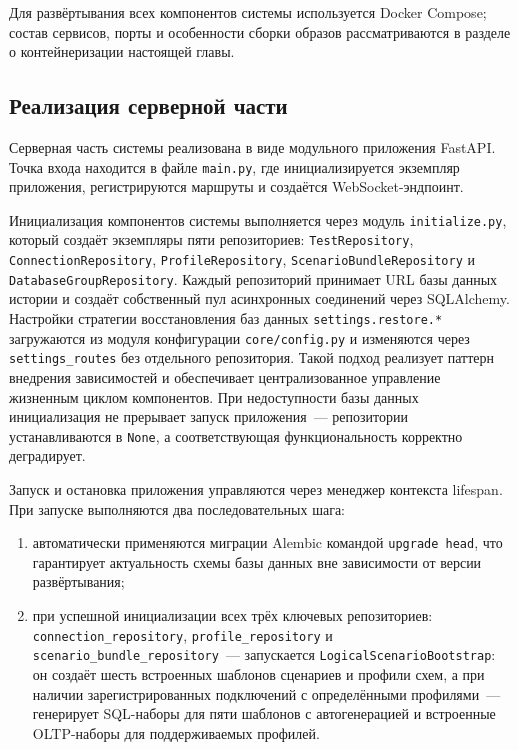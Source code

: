 Для развёртывания всех компонентов системы используется Docker Compose; состав сервисов, порты и особенности сборки образов рассматриваются в разделе о контейнеризации настоящей главы.

\subsection{Реализация серверной части}

Серверная часть системы реализована в виде модульного приложения FastAPI. Точка входа находится в файле \texttt{main.py}, где инициализируется экземпляр приложения, регистрируются маршруты и создаётся WebSocket-эндпоинт.

Инициализация компонентов системы выполняется через модуль \texttt{initialize.py}, который создаёт экземпляры пяти репозиториев: \texttt{TestRepository}, \texttt{ConnectionRepository}, \texttt{ProfileRepository}, \texttt{ScenarioBundleRepository} и \texttt{DatabaseGroupRepository}. Каждый репозиторий принимает URL базы данных истории и создаёт собственный пул асинхронных соединений через SQLAlchemy. Настройки стратегии восстановления баз данных \texttt{settings.restore.*} загружаются из модуля конфигурации \texttt{core/config.py} и изменяются через \texttt{settings\_routes} без отдельного репозитория. Такой подход реализует паттерн внедрения зависимостей и обеспечивает централизованное управление жизненным циклом компонентов. При недоступности базы данных инициализация не прерывает запуск приложения~--- репозитории устанавливаются в \texttt{None}, а соответствующая функциональность корректно деградирует.

Запуск и остановка приложения управляются через менеджер контекста lifespan. При запуске выполняются два последовательных шага:

\begin{enumerate}[label=\arabic*)]
    \item автоматически применяются миграции Alembic командой \texttt{upgrade head}, что гарантирует актуальность схемы базы данных вне зависимости от версии развёртывания;
    \item при успешной инициализации всех трёх ключевых репозиториев: \texttt{connection\_repository}, \texttt{profile\_repository} и \texttt{scenario\_bundle\_repository}~--- запускается \texttt{LogicalScenarioBootstrap}: он создаёт шесть встроенных шаблонов сценариев и профили схем, а при наличии зарегистрированных подключений с определёнными профилями~--- генерирует SQL-наборы для пяти шаблонов с автогенерацией и встроенные OLTP-наборы для поддерживаемых профилей.
\end{enumerate}

